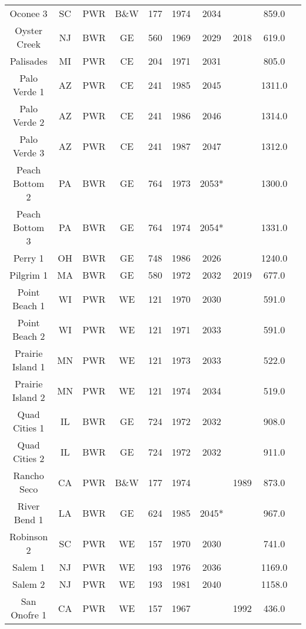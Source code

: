 \begin{table}
\begin{tabular}{c c c c c c c c c c}
    Oconee 3            & SC & PWR & B\&W & 177 & 1974 & 2034 &      & 859.0 \\
    Oyster Creek        & NJ & BWR & GE   & 560 & 1969 & 2029 & 2018 & 619.0 \\
    Palisades           & MI & PWR & CE   & 204 & 1971 & 2031 &      & 805.0 \\
    Palo Verde 1        & AZ & PWR & CE   & 241 & 1985 & 2045 &      & 1311.0\\
    Palo Verde 2        & AZ & PWR & CE   & 241 & 1986 & 2046 &      & 1314.0\\
    Palo Verde 3        & AZ & PWR & CE   & 241 & 1987 & 2047 &      & 1312.0\\
    Peach Bottom 2      & PA & BWR & GE   & 764 & 1973 & 2053*&      & 1300.0\\
    Peach Bottom 3      & PA & BWR & GE   & 764 & 1974 & 2054*&      & 1331.0\\
    Perry 1             & OH & BWR & GE   & 748 & 1986 & 2026 &      & 1240.0\\
    Pilgrim 1           & MA & BWR & GE   & 580 & 1972 & 2032 & 2019 & 677.0 \\
    Point Beach 1       & WI & PWR & WE   & 121 & 1970 & 2030 &      & 591.0 \\
    Point Beach 2       & WI & PWR & WE   & 121 & 1971 & 2033 &      & 591.0 \\
    Prairie Island 1    & MN & PWR & WE   & 121 & 1973 & 2033 &      & 522.0 \\
    Prairie Island 2    & MN & PWR & WE   & 121 & 1974 & 2034 &      & 519.0 \\
    Quad Cities 1       & IL & BWR & GE   & 724 & 1972 & 2032 &      & 908.0 \\
    Quad Cities 2       & IL & BWR & GE   & 724 & 1972 & 2032 &      & 911.0 \\
    Rancho Seco         & CA & PWR & B\&W & 177 & 1974 &      & 1989 & 873.0 \\
    River Bend 1        & LA & BWR & GE   & 624 & 1985 & 2045*&      & 967.0 \\
    Robinson 2          & SC & PWR & WE   & 157 & 1970 & 2030 &      & 741.0 \\
    Salem 1             & NJ & PWR & WE   & 193 & 1976 & 2036 &      & 1169.0\\
    Salem 2             & NJ & PWR & WE   & 193 & 1981 & 2040 &      & 1158.0\\
    San Onofre 1        & CA & PWR & WE   & 157 & 1967 &      & 1992 & 436.0 \\

\end{tabular}
\end{table}
